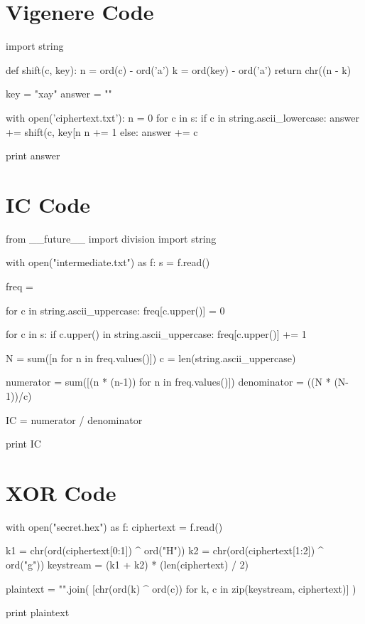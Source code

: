 \documentclass[11pt,a4paper,twoside]{article}
\begin{document}
\section{Vigenere Code}
\label{vig_code}
\begin{python}
import string

def shift(c, key):
    n = ord(c) - ord('a')
    k = ord(key) - ord('a')
    return chr((n - k) %

key = "xay"
answer = ""

with open('ciphertext.txt'):
    n = 0
    for c in s:
        if c in string.ascii_lowercase:
            answer += shift(c, key[n%
            n += 1
        else:
            answer += c
        
print answer
\end{python}

\section{IC Code}
\label{IC_code}
\begin{python}
from __future__ import division
import string

with open("intermediate.txt") as f: 
    s = f.read()

    freq = {}

    for c in string.ascii_uppercase:
        freq[c.upper()] = 0

    for c in s:
        if c.upper() in string.ascii_uppercase:
            freq[c.upper()] += 1
                           
    N = sum([n for n in freq.values()])
    c = len(string.ascii_uppercase)

    numerator = sum([(n * (n-1)) for n in freq.values()]) 
    denominator = ((N * (N-1))/c)

    IC = numerator / denominator 

    print IC
\end{python}

\section{XOR Code}
\label{XOR_code}
\begin{python}
with open("secret.hex") as f:
    ciphertext = f.read()

    k1 = chr(ord(ciphertext[0:1]) ^ ord("H"))
    k2 = chr(ord(ciphertext[1:2]) ^ ord("g"))
    keystream = (k1 + k2) * (len(ciphertext) / 2)

    plaintext = "".join(
            [chr(ord(k) ^ ord(c)) 
             for k, c in zip(keystream, ciphertext)]
    )

    print plaintext
\end{python}
\end{document}
